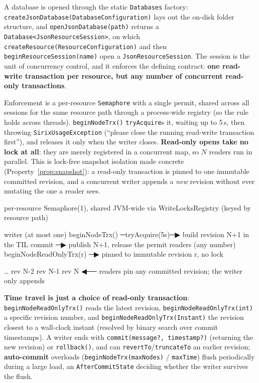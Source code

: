 \documentclass[11pt,a4paper,oneside]{report}
\newcommand{\dcap}[1]{\par\vspace{1pt}\noindent{\small\sffamily\bfseries\color{slate}#1}\par\vspace{-2pt}}
\theoremstyle{sirixthm}
\newcommand{\code}[1]{\texttt{#1}}
\begin{document}
A database is opened through the static \code{Databases} factory:
\code{createJsonDatabase(DatabaseConfiguration)} lays out the on-disk folder structure, and
\code{openJsonDatabase(path)} returns a \code{Database<JsonResourceSession>}, on which
\code{createResource(ResourceConfiguration)} and then \code{beginResourceSession(name)} open a
\code{JsonResourceSession}. The session is the unit of concurrency control, and it enforces the defining
contract: \textbf{one read-write transaction per resource, but any number of concurrent read-only
transactions}.

Enforcement is a per-resource \code{Semaphore} with a single permit, shared across all sessions for the
same resource path through a process-wide registry (so the rule holds across threads).
\code{beginNodeTrx()} \code{tryAcquire}s it, waiting up to 5\,s, then throwing
\code{SirixUsageException} (``please close the running read-write transaction first''), and releases
it only when the writer closes. \textbf{Read-only opens take no lock at all}: they are merely registered
in a concurrent map, so $N$ readers run in parallel. This is lock-free snapshot isolation made concrete
(Property~\ref{prop:snapshot}): a read-only transaction is pinned to one immutable committed revision,
and a concurrent writer appends a \emph{new} revision without ever mutating the one a reader sees.

\dcap{One writer, many readers, no read locks}
\begin{diagramS}
per-resource Semaphore(1), shared JVM-wide via WriteLocksRegistry (keyed by resource path)

  writer (at most one)   beginNodeTrx() ─tryAcquire(5s)─▶ build revision N+1 in the TIL
                         commit ─▶ publish N+1, release the permit
  readers (any number)   beginNodeReadOnlyTrx(r) ─▶ pinned to immutable revision r, no lock

   … rev N-2   rev N-1   rev N   ◀── readers pin any committed revision; the writer only appends
\end{diagramS}

\textbf{Time travel is just a choice of read-only transaction}: \code{beginNodeReadOnlyTrx()} reads the
latest revision, \code{beginNodeReadOnlyTrx(int)} a specific revision number, and
\code{beginNodeReadOnlyTrx(Instant)} the revision closest to a wall-clock instant (resolved by binary
search over commit timestamps). A writer ends with \code{commit(message?, timestamp?)} (returning the
new revision) or \code{rollback()}, and can \code{revertTo}/\allowbreak\code{truncateTo} an earlier revision;
\textbf{auto-commit} overloads (\code{beginNodeTrx(maxNodes)} / \code{maxTime}) flush periodically during
a large load, an \code{AfterCommitState} deciding whether the writer survives the flush.
\end{document}
